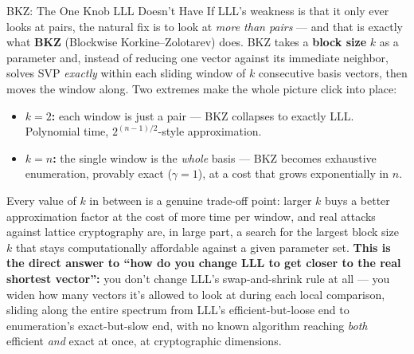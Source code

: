 \begin{factbox}{BKZ: The One Knob LLL Doesn't Have}
If LLL's weakness is that it only ever looks at pairs, the natural fix is to look at \emph{more than pairs} --- and that is exactly what \textbf{BKZ} (Blockwise Korkine--Zolotarev) does. BKZ takes a \textbf{block size} $k$ as a parameter and, instead of reducing one vector against its immediate neighbor, solves SVP \emph{exactly} within each sliding window of $k$ consecutive basis vectors, then moves the window along. Two extremes make the whole picture click into place:
\begin{itemize}[leftmargin=*]
  \item \textbf{$k=2$:} each window is just a pair --- BKZ collapses to exactly LLL. Polynomial time, $2^{(n-1)/2}$-style approximation.
  \item \textbf{$k=n$:} the single window is the \emph{whole} basis --- BKZ becomes exhaustive enumeration, provably exact ($\gamma=1$), at a cost that grows exponentially in $n$.
\end{itemize}
Every value of $k$ in between is a genuine trade-off point: larger $k$ buys a better approximation factor at the cost of more time per window, and real attacks against lattice cryptography are, in large part, a search for the largest block size $k$ that stays computationally affordable against a given parameter set. \textbf{This is the direct answer to ``how do you change LLL to get closer to the real shortest vector'':} you don't change LLL's swap-and-shrink rule at all --- you widen how many vectors it's allowed to look at during each local comparison, sliding along the entire spectrum from LLL's efficient-but-loose end to enumeration's exact-but-slow end, with no known algorithm reaching \emph{both} efficient \emph{and} exact at once, at cryptographic dimensions.
\end{factbox}

